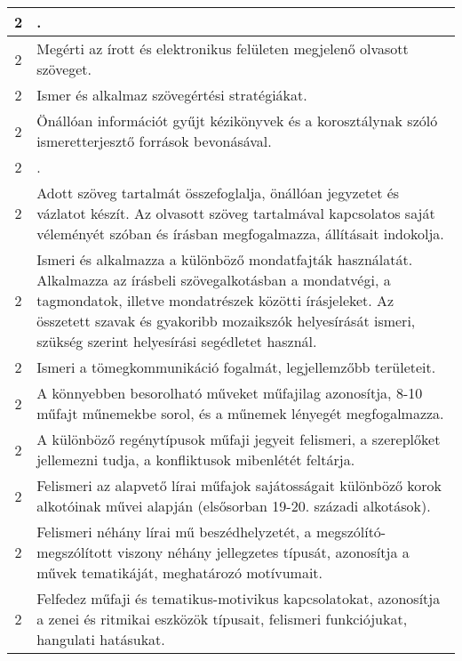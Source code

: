 \begin{longtable}{c | p{12cm} }
                                          2 &  . \\ \hline
                                          2 &  Megérti az írott és elektronikus felületen megjelenő olvasott szöveget. \\ \hline
                                          2 &  Ismer és alkalmaz szövegértési stratégiákat. \\ \hline
                                          2 &  Önállóan információt gyűjt kézikönyvek és a korosztálynak szóló ismeretterjesztő források bevonásával. \\ \hline
                                          2 &  . \\ \hline
                                          2 &  Adott szöveg tartalmát összefoglalja, önállóan jegyzetet és vázlatot készít. Az olvasott szöveg tartalmával kapcsolatos saját véleményét szóban és írásban megfogalmazza, állításait indokolja. \\ \hline
                                          2 &  Ismeri és alkalmazza a különböző mondatfajták használatát. Alkalmazza az írásbeli szövegalkotásban a mondatvégi, a tagmondatok, illetve mondatrészek közötti írásjeleket. Az összetett szavak és gyakoribb mozaikszók helyesírását ismeri, szükség szerint helyesírási segédletet használ. \\ \hline
                                          2 &  Ismeri a tömegkommunikáció fogalmát, legjellemzőbb területeit. \\ \hline
                                          2 &  A könnyebben besorolható műveket műfajilag azonosítja, 8-10 műfajt műnemekbe sorol, és a műnemek lényegét megfogalmazza. \\ \hline
                                          2 &  A különböző regénytípusok műfaji jegyeit felismeri, a szereplőket jellemezni tudja, a konfliktusok mibenlétét feltárja. \\ \hline
                                          2 &  Felismeri az alapvető lírai műfajok sajátosságait különböző korok alkotóinak művei alapján (elsősorban 19-20. századi alkotások). \\ \hline
                                          2 &  Felismeri néhány lírai mű beszédhelyzetét, a megszólító-megszólított viszony néhány jellegzetes típusát, azonosítja a művek tematikáját, meghatározó motívumait. \\ \hline
                                          2 &  Felfedez műfaji és tematikus-motivikus kapcsolatokat, azonosítja a zenei és ritmikai eszközök típusait, felismeri funkciójukat, hangulati hatásukat. \\ \hline

\end{longtable}
